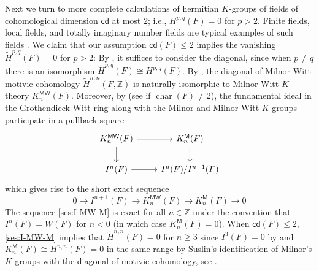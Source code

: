 \documentclass[11pt,hyp,english]{article}
\newcommand{\Z}{\mathbb{Z}}
\newcommand{\Char}{\operatorname{char}}
\newcommand{\cd}{{\mathsf{cd}}}
\newcommand{\MW}{{\mathsf{MW}}}
\newcommand{\sfM}{{\mathsf{M}}}
\newtheorem{defn}[theorem]{Definition}
\theoremstyle{definition}
\newtheorem{remark}[theorem]{Remark}
\begin{document}
Next we turn to more complete calculations of 
hermitian $K$-groups of fields of cohomological 
dimension $\cd$ at most $2$;
i.e.,  
$H^{p,q}(F)=0$ for $p>2$.
Finite fields, local fields, and totally imaginary number fields are 
typical examples of such fields \cite[Section 14]{levine99}.
We claim that our assumption 
$\cd(F)\leq 2$ implies the vanishing 
$\widetilde{H}^{p,q}(F)=0$ for $p>2$:
By \cite[Theorem 17]{Bachmann}, 
it suffices to consider the diagonal,  
since when $p\neq q$ there is an 
isomorphism
$\widetilde{H}^{p,q}(F)\cong H^{p,q}(F)$.
By \cite[Chapter 5]{2020arXiv200406634B}, 
the diagonal of Milnor-Witt motivic cohomology 
$\widetilde{H}^{n,n}(F,\Z)$ 
is naturally isomorphic to Milnor-Witt 
$K$-theory $K_n^\MW(F)$. 
Moreover, 
by \cite[Cor.~2.3.7]{deglise2023notesmilnorwittktheory} (see \cite[Theorem 5.3]{Morel-Witt} if $\Char(F)\neq 2$), 
the fundamental ideal in the 
Grothendieck-Witt ring along with the 
Milnor and Milnor-Witt $K$-groups 
participate in a pullback square
\[\begin{tikzcd}
K_n^\MW(F)\ar{r}\ar{d} & K_n^\sfM(F)\ar{d}\\
I^n(F)\ar{r} & I^n(F)/I^{n+1}(F)
\end{tikzcd}\]
which gives rise to the short exact sequence
\begin{equation}\label{ses:I-MW-M}
0\to I^{n+1}(F)\to K_n^\MW(F)\to K_n^\sfM(F)\to0
\end{equation}
The sequence \eqref{ses:I-MW-M} is 
exact for all $n\in\Z$ under the 
convention that $I^n(F)=W(F)$ for $n< 0$
\cite[Chapter 2, Example 6.1.5]{2020arXiv200406634B}
(in which case $K_n^\sfM(F)=0$).
When $\cd(F)\le2$, 
\eqref{ses:I-MW-M} implies that 
$\widetilde{H}^{n,n}(F)=0$ for 
$n\geq 3$ since $I^3(F)=0$ by 
\cite[p. 81]{Milnor-Husemoller} and $K_n^\sfM(F)\cong H^{n,n}(F)=0$
in the same range 
by Suslin's identification of Milnor's $K$-groups with the diagonal 
of motivic cohomology, 
see \cite[Lecture 5]{zbMATH05051055}.


\end{document}
